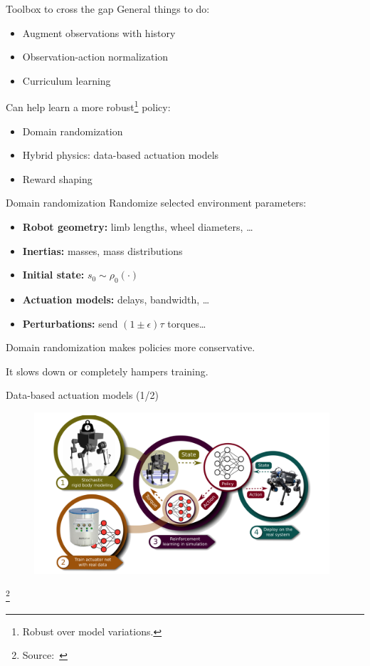 \documentclass[10pt, aspectratio=1610]{beamer}
\newcommand\blfootnote[1]{%
  \begingroup
  \renewcommand\thefootnote{}%
  \footnote{#1}%
  \addtocounter{footnote}{-1}%
  \endgroup
}
\begin{document}
\begin{frame}{Toolbox to cross the gap}
    General things to do:
    \begin{itemize}
        \item Augment observations with history
        \item Observation-action normalization
        \item Curriculum learning
    \end{itemize}
    Can help learn a more robust\footnote{Robust over model variations.} policy:
    \begin{itemize}
        \item Domain randomization
        \item Hybrid physics: data-based actuation models
        \item Reward shaping
    \end{itemize}
\end{frame}

\begin{frame}{Domain randomization}
    Randomize selected environment parameters:
    \begin{itemize}
        \item \textbf{Robot geometry:} limb lengths, wheel diameters, \ldots
        \item \textbf{Inertias:} masses, mass distributions
        \item \textbf{Initial state:} $s_0 \sim \rho_0(\cdot)$
        \item \textbf{Actuation models:} delays, bandwidth, \ldots
        \item \textbf{Perturbations:} send $(1 \pm \epsilon) \tau$ torques\ldots
    \end{itemize}
    Domain randomization makes policies more conservative.

    It slows down or completely hampers training.
\end{frame}

\begin{frame}{Data-based actuation models (1/2)}
    \begin{figure}
        \includegraphics[height=6cm]{figures/quadruped-sim-pipeline.png}
    \end{figure}
    \blfootnote{
        Source:~\cite{hwangbo2019}
    }
\end{frame}
\end{document}
